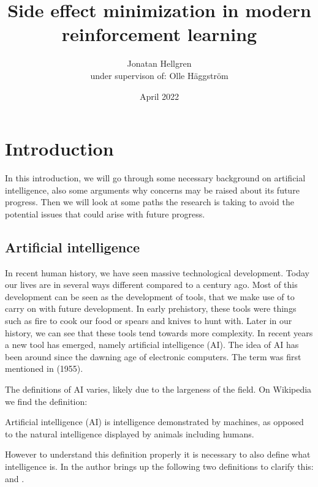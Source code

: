 \documentclass[12pt,A4]{report}
\title{Side effect minimization in modern reinforcement learning}
\author{Jonatan Hellgren\\
under supervison of: Olle Häggström}
\date{April 2022}
\theoremstyle{definition}
\begin{document}
\maketitle


\thispagestyle{empty}

\newpage
{}

\tableofcontents

\newpage
{}

% 

\chapter{Introduction}
In this introduction, we will go through some necessary background on artificial intelligence, also some arguments why concerns may be raised about its future progress. Then we will look at some paths the research is taking to avoid the potential issues that could arise with future progress. 

\section{Artificial intelligence}

In recent human history, we have seen massive technological development. Today our lives are in several ways different compared to a century ago. Most of this development can be seen as the development of tools, that we make use of to carry on with future development. In early prehistory, these tools were things such as fire to cook our food or spears and knives to hunt with. Later in our history, we can see that these tools tend towards more complexity. In recent years a new tool has emerged, namely artificial intelligence (AI). The idea of AI has been around since the dawning age of electronic computers. The term was first mentioned in \autocite{John McCarthy et al} (1955).

The definitions of AI varies, likely due to the largeness of the field. On Wikipedia we find the definition\autocite{Wikipedia}:
\begin{displayquote}
Artificial intelligence (AI) is intelligence demonstrated by machines, as opposed to the natural intelligence displayed by animals including humans.
\end{displayquote}
However to understand this definition properly it is necessary to also define what intelligence is. In \autocite{Tänkande Maskiner} the author brings up the following two definitions to clarify this:  and . 
\end{document}
